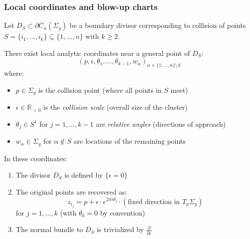 \subsubsection{Local coordinates and blow-up charts}

\begin{theorem}\label{thm:local-coords-boundary}
Let $D_S \subset \partial\overline{C}_n(\Sigma_g)$ be a boundary divisor corresponding to collision of points $S = \{i_1, \ldots, i_k\} \subseteq \{1,\ldots,n\}$ with $k \geq 2$.

There exist local analytic coordinates near a general point of $D_S$:
\[(p, \epsilon, \theta_1, \ldots, \theta_{k-1}, w_{\alpha})_{\alpha \in \{1,\ldots,n\}\setminus S}\]
where:
\begin{itemize}
\item $p \in \Sigma_g$ is the collision point (where all points in $S$ meet)
\item $\epsilon \in \mathbb{R}_{>0}$ is the \emph{collision scale} (overall size of the cluster)
\item $\theta_j \in S^1$ for $j=1,\ldots,k-1$ are \emph{relative angles} (directions of approach)
\item $w_{\alpha} \in \Sigma_g$ for $\alpha \notin S$ are locations of the remaining points
\end{itemize}

In these coordinates:
\begin{enumerate}
\item The divisor $D_S$ is defined by $\{\epsilon = 0\}$
\item The original points are recovered as:
\[z_{i_j} = p + \epsilon \cdot e^{2\pi i \theta_j} \cdot (\text{fixed direction in } T_p\Sigma_g)\]
for $j = 1, \ldots, k$ (with $\theta_k = 0$ by convention)
\item The normal bundle to $D_S$ is trivialized by $\frac{\partial}{\partial \epsilon}$
\end{enumerate}
\end{theorem}

